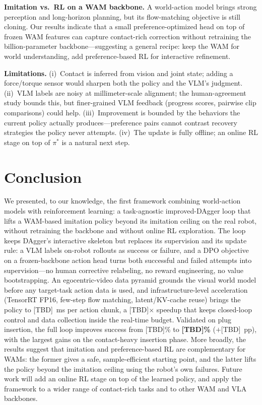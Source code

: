 \documentclass[letterpaper, 10pt, conference]{ieeeconf}
\begin{document}
\textbf{Imitation vs.\ RL on a WAM backbone.} A world-action model brings strong perception and long-horizon planning, but its flow-matching objective is still cloning. Our results indicate that a small preference-optimized head on top of frozen WAM features can capture contact-rich correction without retraining the billion-parameter backbone---suggesting a general recipe: keep the WAM for world understanding, add preference-based RL for interactive refinement.

\textbf{Limitations.} (i)~Contact is inferred from vision and joint state; adding a force/torque sensor would sharpen both the policy and the VLM's judgment. (ii)~VLM labels are noisy at millimeter-scale alignment; the human-agreement study bounds this, but finer-grained VLM feedback (progress scores, pairwise clip comparisons) could help. (iii)~Improvement is bounded by the behaviors the current policy actually produces---preference pairs cannot contrast recovery strategies the policy never attempts. (iv)~The update is fully offline; an online RL stage on top of $\pi^{*}$ is a natural next step.

\section{Conclusion}
\label{sec:conclusion}

We presented, to our knowledge, the first framework combining world-action models with reinforcement learning: a task-agnostic improved-DAgger loop that lifts a WAM-based imitation policy beyond its imitation ceiling on the real robot, without retraining the backbone and without online RL exploration. The loop keeps DAgger's interactive skeleton but replaces its supervision and its update rule: a VLM labels on-robot rollouts as success or failure, and a DPO objective on a frozen-backbone action head turns both successful and failed attempts into supervision---no human corrective relabeling, no reward engineering, no value bootstrapping. An egocentric-video data pyramid grounds the visual world model before any target-task action data is used, and infrastructure-level acceleration (TensorRT FP16, few-step flow matching, latent/KV-cache reuse) brings the policy to [TBD]~ms per action chunk, a [TBD]$\times$ speedup that keeps closed-loop control and data collection inside the real-time budget. Validated on plug insertion, the full loop improves success from [TBD]\% to \textbf{[TBD]\%} ($+$[TBD]~pp), with the largest gains on the contact-heavy insertion phase. More broadly, the results suggest that imitation and preference-based RL are complementary for WAMs: the former gives a safe, sample-efficient starting point, and the latter lifts the policy beyond the imitation ceiling using the robot's own failures. Future work will add an online RL stage on top of the learned policy, and apply the framework to a wider range of contact-rich tasks and to other WAM and VLA backbones.
\end{document}
